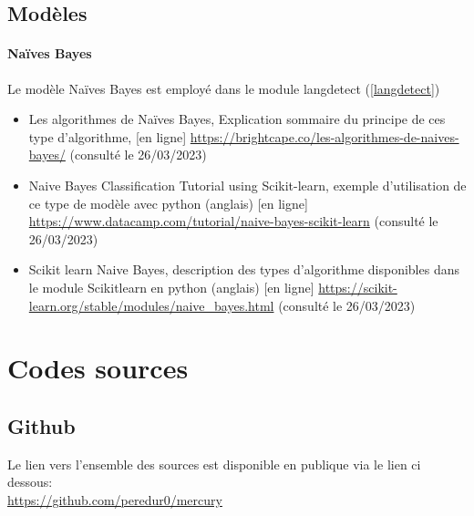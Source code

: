 \documentclass[a4paper,12pt]{article}
\begin{document}
		\subsection{Modèles}
			\paragraph{Naïves Bayes}
				Le modèle Naïves Bayes est employé dans le module langdetect (\ref{langdetect})
			\begin{itemize}
				\item Les algorithmes de Naïves Bayes, Explication sommaire du principe de ces type d'algorithme, [en ligne] \url{https://brightcape.co/les-algorithmes-de-naives-bayes/} (consulté le 26/03/2023)
				\item Naive Bayes Classification Tutorial using Scikit-learn, exemple d'utilisation de ce type de modèle avec python (anglais) [en ligne] \url{https://www.datacamp.com/tutorial/naive-bayes-scikit-learn} (consulté le 26/03/2023)
				\item Scikit learn Naive Bayes, description des types d'algorithme disponibles dans le module Scikitlearn en python (anglais) [en ligne] \url{https://scikit-learn.org/stable/modules/naive_bayes.html} (consulté le 26/03/2023)
			\end{itemize}
			
	\section{Codes sources}
		\subsection{Github}
			Le lien vers l'ensemble des sources est disponible en publique via le lien ci dessous:\\
			\url{https://github.com/peredur0/mercury}
			
\end{document}

